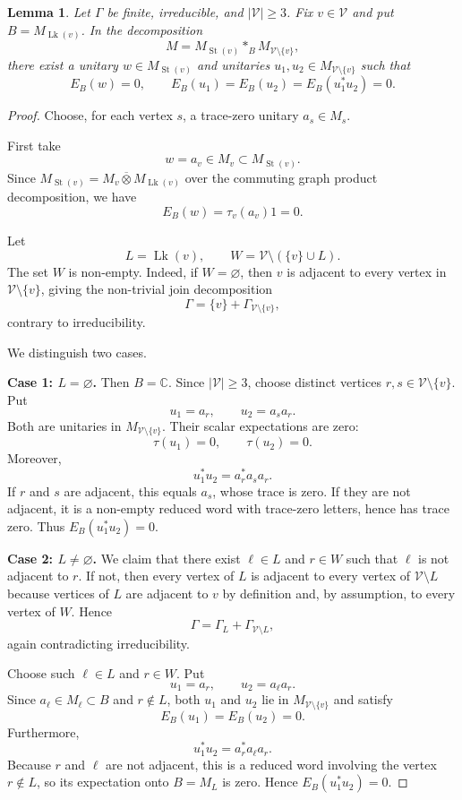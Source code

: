 \documentclass[12pt]{article}
\newtheorem{lemma}[theorem]{Lemma}
\theoremstyle{definition}
\newcommand{\V}{\mathcal V}
\newcommand{\Lk}{\operatorname{Lk}}
\newcommand{\St}{\operatorname{St}}
\newcommand{\C}{\mathbb C}
\newcommand{\bbarotimes}{\mathbin{\overline\otimes}}
\newcommand{\freeprod}{\mathop{*}}
\begin{document}
\begin{lemma}\label{lem:unitaries}
Let $\Gamma$ be finite, irreducible, and $|\V|\geq 3$.  Fix $v\in\V$ and put $B=M_{\Lk(v)}$.  In the decomposition
\[
M
=
M_{\St(v)}
\freeprod_B
M_{\V\setminus\{v\}},
\]
there exist a unitary $w\in M_{\St(v)}$ and unitaries $u_1,u_2\in M_{\V\setminus\{v\}}$ such that
\[
E_B(w)=0,\qquad
E_B(u_1)=E_B(u_2)=E_B(u_1^*u_2)=0.
\]
\end{lemma}

\begin{proof}
Choose, for each vertex $s$, a trace-zero unitary $a_s\in M_s$.

First take
\[
w=a_v\in M_v\subset M_{\St(v)}.
\]
Since $M_{\St(v)}=M_v\bbarotimes M_{\Lk(v)}$ over the commuting graph product decomposition, we have
\[
E_B(w)=\tau_v(a_v)1=0.
\]

Let
\[
L=\Lk(v),\qquad W=\V\setminus(\{v\}\cup L).
\]
The set $W$ is non-empty.  Indeed, if $W=\varnothing$, then $v$ is adjacent to every vertex in $\V\setminus\{v\}$, giving the non-trivial join decomposition
\[
\Gamma=\{v\}+\Gamma_{\V\setminus\{v\}},
\]
contrary to irreducibility.

We distinguish two cases.

\smallskip

\noindent\textbf{Case 1: $L=\varnothing$.}
Then $B=\C$.  Since $|\V|\geq 3$, choose distinct vertices $r,s\in \V\setminus\{v\}$.  Put
\[
u_1=a_r,\qquad u_2=a_s a_r.
\]
Both are unitaries in $M_{\V\setminus\{v\}}$.  Their scalar expectations are zero:
\[
\tau(u_1)=0,\qquad \tau(u_2)=0.
\]
Moreover,
\[
u_1^*u_2=a_r^*a_s a_r.
\]
If $r$ and $s$ are adjacent, this equals $a_s$, whose trace is zero.  If they are not adjacent, it is a non-empty reduced word with trace-zero letters, hence has trace zero.  Thus $E_B(u_1^*u_2)=0$.

\smallskip

\noindent\textbf{Case 2: $L\neq \varnothing$.}
We claim that there exist $\ell\in L$ and $r\in W$ such that $\ell$ is not adjacent to $r$.  If not, then every vertex of $L$ is adjacent to every vertex of $\V\setminus L$ because vertices of $L$ are adjacent to $v$ by definition and, by assumption, to every vertex of $W$.  Hence
\[
\Gamma=\Gamma_L+\Gamma_{\V\setminus L},
\]
again contradicting irreducibility.

Choose such $\ell\in L$ and $r\in W$.  Put
\[
u_1=a_r,\qquad u_2=a_\ell a_r.
\]
Since $a_\ell\in M_\ell\subset B$ and $r\notin L$, both $u_1$ and $u_2$ lie in $M_{\V\setminus\{v\}}$ and satisfy
\[
E_B(u_1)=E_B(u_2)=0.
\]
Furthermore,
\[
u_1^*u_2=a_r^*a_\ell a_r.
\]
Because $r$ and $\ell$ are not adjacent, this is a reduced word involving the vertex $r\notin L$, so its expectation onto $B=M_L$ is zero.  Hence $E_B(u_1^*u_2)=0$.
\end{proof}
\end{document}
